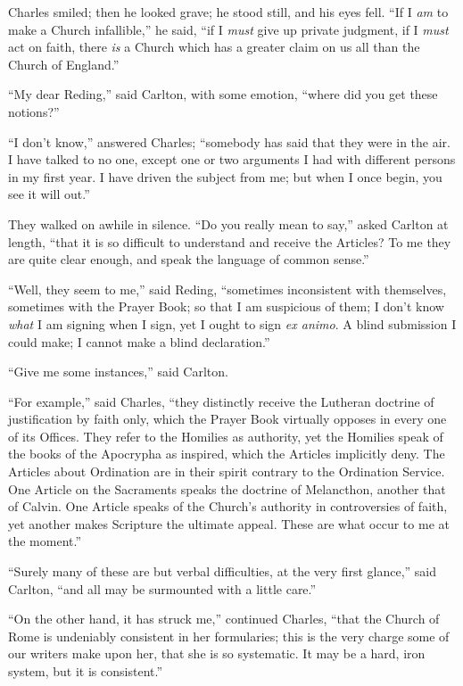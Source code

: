 Charles smiled; then he looked grave; he stood still, and his eyes
fell. ``If I \emph{am} to make a Church infallible,'' he said,
``if I \emph{must} give up private judgment, if I \emph{must} act
on faith, there \emph{is} a Church which has a greater claim on us all
than the Church of England.''

``My dear Reding,'' said Carlton, with some emotion,
``where did you get these notions?''

``I don't know,'' answered Charles; ``somebody has said
that they were in the air. I have talked to no one, except one or two
arguments I had with different persons in my first year. I have driven
the subject from me; but when I once begin, you see it will out.''

They walked on awhile in silence. ``Do you really mean to
say,'' asked Carlton at length, ``that it is so difficult to
understand and receive the Articles? To me they are quite clear
enough, and speak the language of common sense.''

``Well, they seem to me,'' said Reding, ``sometimes
inconsistent with themselves, sometimes with the Prayer Book; so that
I am suspicious of them; I don't know \emph{what} I am signing when I
sign, yet I ought to sign \emph{ex animo}. A blind submission I could
make; I cannot make a blind declaration.''

``Give me some instances,'' said Carlton.

``For example,'' said Charles, ``they distinctly
receive the Lutheran doctrine of justification by faith only, which
the Prayer Book virtually opposes in every one of its Offices. They
refer to the Homilies as authority, yet the Homilies speak of the
books of the Apocrypha as inspired, which the Articles implicitly
deny. The Articles about Ordination are in their spirit contrary to
the Ordination Service. One Article on the Sacraments speaks the
doctrine of Melancthon, another that of Calvin. One Article speaks of
the Church's authority in controversies of faith, yet another makes
Scripture the ultimate appeal. These are what occur to me at the
moment.''

``Surely many of these are but verbal difficulties, at the very
first glance,'' said Carlton, ``and all may be surmounted with
a little care.''

``On the other hand, it has struck me,'' continued Charles,
``that the Church of Rome is undeniably consistent in her
formularies; this is the very charge some of our writers make
upon her, that she is so systematic. It may be a hard, iron system,
but it is consistent.''

